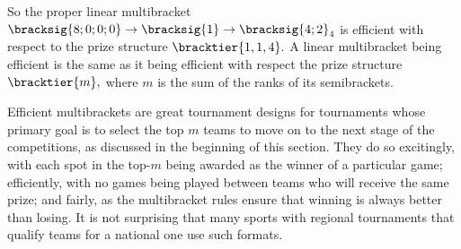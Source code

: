 {    So the proper linear multibracket $\bracksig{8;0;0;0} \to \bracksig{1} \to \bracksig{4;2}_4$ is efficient with respect to the prize structure $\bracktier{1, 1, 4}.$ A linear multibracket being efficient is the same as it being efficient with respect the prize structure $\bracktier{m},$ where $m$ is the sum of the ranks of its semibrackets.

    Efficient multibrackets are great tournament designs for tournaments whose primary goal is to select the top $m$ teams to move on to the next stage of the competitions, as discussed in the beginning of this section. They do so excitingly, with each spot in the top-$m$ being awarded as the winner of a particular game; efficiently, with no games being played between teams who will receive the same prize; and fairly, as the multibracket rules ensure that winning is always better than losing. It is not surprising that many sports with regional tournaments that qualify teams for a national one use such formats.
}